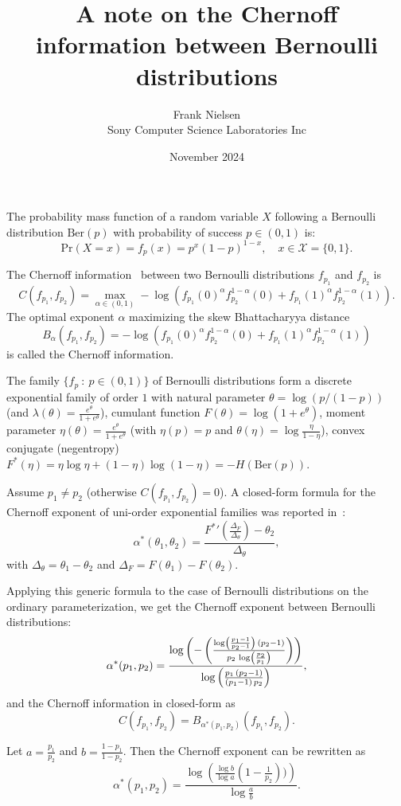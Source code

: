 \documentclass[11pt]{article}
\title{A note on the Chernoff information between Bernoulli distributions}
\author{Frank Nielsen\\
Sony Computer Science Laboratories Inc}
\date{November 2024}
\def\Ber{\mathrm{Ber}}
\def\Pr{\mathrm{Pr}}
\def\calX{\mathcal{X}}
\begin{document}
\maketitle
 
The probability mass function of a random variable $X$ following a Bernoulli distribution $\Ber(p)$ with probability of success $p\in (0,1)$ is:
$$
\Pr(X=x) = f_p(x)= p^x (1-p)^{1-x},\quad x\in\calX=\{0,1\}.
$$

The Chernoff information~\cite{chernoff1952measure} between two Bernoulli distributions $f_{p_1}$ and $f_{p_2}$ is
$$
C(f_{p_1},f_{p_2})=\max_{\alpha\in(0,1)} -\log \left( f_{p_1}(0)^\alpha f_{p_2}^{1-\alpha}(0) + f_{p_1}(1)^\alpha f_{p_2}^{1-\alpha}(1)\right). 
$$
The optimal exponent $\alpha$ maximizing the skew Bhattacharyya distance 
$$
B_\alpha(f_{p_1},f_{p_2})= -\log \left( f_{p_1}(0)^\alpha f_{p_2}^{1-\alpha}(0) + f_{p_1}(1)^\alpha f_{p_2}^{1-\alpha}(1)\right)
$$ 
is called the Chernoff information.

The family $\{f_p\ :\ p\in(0,1)\}$ of Bernoulli distributions form a discrete exponential family of order $1$
with natural parameter $\theta=\log(p/(1-p))$ (and $\lambda(\theta)=\frac{e^\theta}{1+e^\theta}$), cumulant function $F(\theta)=\log(1+e^\theta)$,
moment parameter $\eta(\theta)=\frac{e^\theta}{1+e^\theta}$ (with $\eta(p)=p$ and $\theta(\eta)=\log\frac{\eta}{1-\eta}$),
 convex conjugate (negentropy) $F^*(\eta)=\eta\log\eta+(1-\eta)\log(1-\eta)=-H(\Ber(p))$.

Assume $p_1\not =p_2$ (otherwise $C(f_{p_1},f_{p_2})=0$).
A closed-form formula for the Chernoff exponent of uni-order exponential families was reported in~\cite{CI-2013}:
$$
\alpha^*(\theta_1,\theta_2)=\frac{{F^*}'\left(\frac{\Delta_F}{\Delta_\theta}\right)-\theta_2}{\Delta_\theta},
$$
with $\Delta_\theta=\theta_1-\theta_2$ and $\Delta_F=F(\theta_1)-F(\theta_2)$.

Applying this generic formula to the case of Bernoulli distributions on the ordinary parameterization, we get the Chernoff exponent between Bernoulli distributions:
$$
\alpha^*(p_1,p_2)=
{{\log \left(-\left({{\log \left({{p_{1}-1}\over{p_{2}-1}}\right)\,
 \left(p_{2}-1\right)}\over{p_{2}\,\log \left({{p_{2}}\over{p_{1}}}
 \right)}}\right)\right)}\over{\log \left({{p_{1}\,\left(p_{2}-1
 \right)}\over{\left(p_{1}-1\right)\,p_{2}}}\right)}},
$$
and the Chernoff information in closed-form as
$$
C(f_{p_1},f_{p_2})=B_{\alpha^*(p_1,p_2)}(f_{p_1},f_{p_2}).
$$

Let $a=\frac{p_1}{p_2}$ and $b=\frac{1-p_1}{1-p_2}$.
Then the Chernoff exponent can be rewritten as
\begin{equation}
{\alpha^*(p_1,p_2)=\frac{\log \left( \frac{\log b}{\log a} \left(1-\frac{1}{p_2}\right))\right)}{\log\frac{a}{b}}}.
\end{equation}
\end{document}
